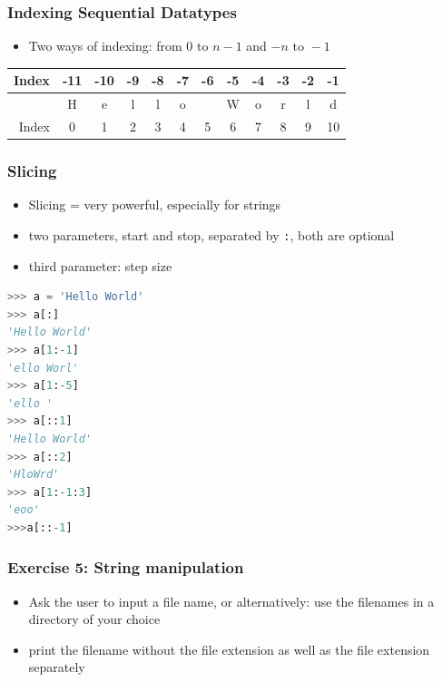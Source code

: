 \documentclass[ngerman]{beamer}
\begin{document}
\begin{frame}
\frametitle{Indexing Sequential Datatypes}

\begin{itemize}
	\item Two ways of indexing: from \(0 \text{ to } n-1\) and \(-n \text{ to } -1\)
\end{itemize}

\begin{center}
\begin{tabular}{r|c|c|c|c|c|c|c|c|c|c|c|}
Index & -11 & -10 & -9 & -8 & -7 & -6 & -5 & -4 & -3 & -2 & -1 \\ \toprule
&H&e&l&l&o& &W&o&r&l&d \\ \toprule
Index & 0 & 1 & 2 & 3 & 4 & 5 & 6 & 7 & 8 & 9 & 10 \\ \toprule
\end{tabular}
\end{center}

\end{frame}

\begin{frame}[containsverbatim]
\frametitle{Slicing}

\begin{itemize}
\item Slicing = very powerful, especially for strings
\item two parameters, start and stop, separated by \texttt{:}, both are optional
\item third parameter: step size
\end{itemize}\vspace*{0em}

\begin{lstlisting}[language={Python}]
>>> a = 'Hello World'
>>> a[:]
'Hello World'
>>> a[1:-1]
'ello Worl'
>>> a[1:-5]
'ello '
>>> a[::1]
'Hello World'
>>> a[::2]
'HloWrd'
>>> a[1:-1:3]
'eoo'
>>>a[::-1]
\end{lstlisting}

\end{frame}

\begin{frame}
\frametitle{Exercise 5: String manipulation}

\begin{itemize}
\item Ask the user to input a file name, or alternatively: use the filenames in a directory of your choice
\item print the filename without the file extension as well as the file extension separately
\end{itemize}
\end{frame}
\end{document}
